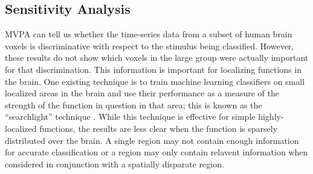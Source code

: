 \documentclass[review,1p,authoryear]{elsarticle}
\begin{document}
\subsection{Sensitivity Analysis}
MVPA can tell us whether the time-series data from a subset of human brain voxels is discriminative with respect to the stimulus being classified. 
However, these results do not show which voxels in the large group were actually important for that discrimination.
This information is important for localizing functions in the brain.
One existing technique is to train machine learning classifiers on small localized areas in the brain and use their performance as a measure of the strength of the function in question in that area; this is known as the ``searchlight'' technique \citep{Kriegeskorte2006}.
While this technique is effective for simple highly-localized functions, the results are less clear when the function is sparsely distributed over the brain.
A single region may not contain enough information for accurate classification or a region may only contain relavent information when considered in conjunction with a spatially disparate region.
\end{document}
